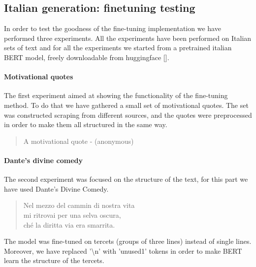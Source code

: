 \documentclass[10pt,twocolumn,letterpaper]{article}
\begin{document}
\subsection{Italian generation: finetuning testing}
In order to test the goodness of the fine-tuning implementation we have performed three experiments.
All the experiments have been performed on Italian sets of text and for all the experiments we started from a pretrained
italian BERT model, freely downloadable from huggingface [].

\paragraph{Motivational quotes} The first experiment aimed at showing the functionality of the fine-tuning method.
To do that we have gathered a small set of motivational quotes.
The set was constructed scraping from different sources, and the quotes were preprocessed in order to make them
all structured in the same way.
\begin{quote}
   A motivational quote - (anonymous)
\end{quote}

\paragraph{Dante's divine comedy} The second experiment was focused on the structure of the text, for this part we have used Dante's Divine Comedy.

\begin{quote}
   Nel mezzo del cammin di nostra vita\\
   mi ritrovai per una selva oscura,\\
   ché la diritta via era smarrita.\\

\end{quote}
The model was fine-tuned on tercets (groups of three lines) instead of single lines.
Moreover, we have replaced '\textbackslash n' with 'unused1' tokens in order to make BERT learn the structure of the tercets.
\end{document}

